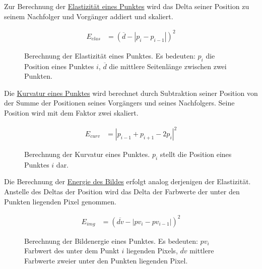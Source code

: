 Zur Berechnung der \underline{Elastizität eines Punktes} wird das Delta seiner Position zu seinem Nachfolger und Vorgänger addiert und skaliert.
\setcounter{figure}{1}
\begin{figure}[H]
    \renewcommand\figurename{Auflistung}
    \begin{align}
        E_{elas} & = (\overline{d} - |p_i - p_{i-1}| )^2
    \end{align}
    \caption{Berechnung der Elastizität eines Punktes. Es bedeuten: $p_i$ die Position eines Punktes $i$, $\overline{d}$ die mittlere Seitenlänge zwischen zwei Punkten.\protect\footnotemark}
\end{figure}

\newpage

Die \underline{Kurvatur eines Punktes} wird berechnet durch Subtraktion seiner Position von der Summe der Positionen seines Vorgängers und seines Nachfolgers. Seine Position wird mit dem Faktor zwei skaliert.
\begin{figure}[H]
    \renewcommand\figurename{Auflistung}
    \begin{align}
        E_{curv} & = |p_{i-1} + p_{i+1} - 2p_i|^2
    \end{align}
    \caption{Berechnung der Kurvatur eines Punktes. $p_i$ stellt die Position eines Punktes $i$ dar.\protect\footnotemark[4]}
\end{figure}

Die Berechnung der \underline{Energie des Bildes} erfolgt analog derjenigen der Elastizität. Anstelle des Deltas der Position wird das Delta der Farbwerte der unter den Punkten liegenden Pixel genommen.
\begin{figure}[H]
    \renewcommand\figurename{Auflistung}
    \begin{align}
        E_{img} & = (\overline{dv} - |pv_i - pv_{i-1}| )^2
    \end{align}
    \caption{Berechnung der Bildenergie eines Punktes. Es bedeuten: $pv_i$ Farbwert des unter dem Punkt $i$ liegenden Pixels, $\overline{dv}$ mittlere Farbwerte zweier unter den Punkten liegenden Pixel.\protect\footnotemark[4]}
\end{figure}

